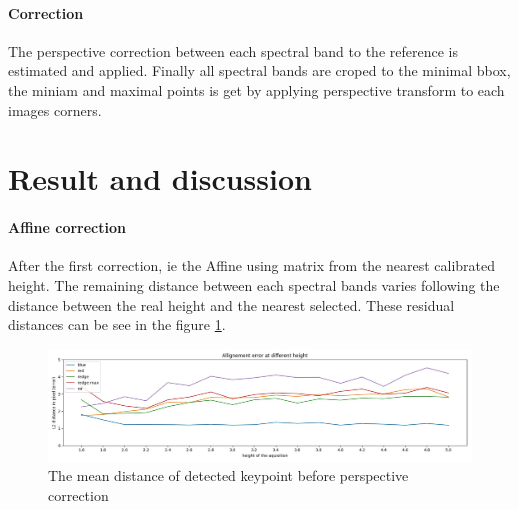 \documentclass[]{elsarticle}
\begin{document}
	\paragraph{Correction}
	The perspective correction between each spectral band to the reference is estimated and applied.
	Finally all spectral bands are croped to the minimal bbox,
	the miniam and maximal points is get by applying perspective transform to each images corners.
	
	
	\section{Result and discussion}
	
	\paragraph{Affine correction} After the first correction, ie the Affine using matrix from the nearest calibrated height.
	The remaining distance between each spectral bands varies following the distance between the real height and the nearest selected.
	These residual distances can be see in the figure \ref{fig:affine-error}.
	
	\begin{figure}[!htb]
		\centering
		\includegraphics[width=\linewidth]{../figures/affine-allignement-rmse.jpg}
		\caption{The mean distance of detected keypoint before perspective correction}
		\label{fig:affine-error}
	\end{figure}
	
\end{document}
